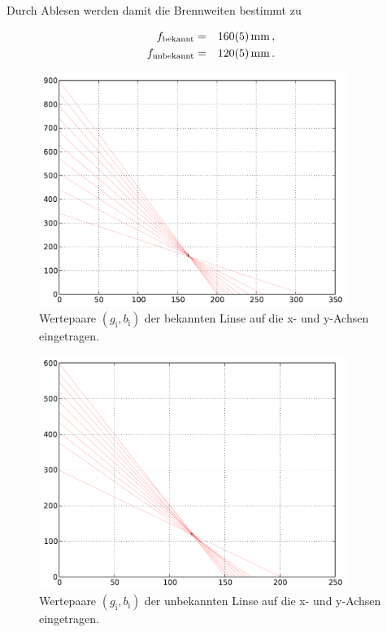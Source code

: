		Durch Ablesen werden damit die Brennweiten bestimmt zu

		\begin{eqnarray*}
			f_\mathrm{bekannt} & = & \SI{160 (5)}{\milli \meter}\,,\\
			f_\mathrm{unbekannt} & = & \SI{120 (5)}{\milli \meter}\,.
		\end{eqnarray*}

		\begin{figure}[h!]
			\centering
			\includegraphics[width = 10cm]{img/graph_bekannt.pdf}
			\caption{Wertepaare $(g_\mathrm{i}, b_\mathrm{i})$ der bekannten Linse auf die x- und y-Achsen eingetragen.}
			\label{fig:graph_bekannt}
		\end{figure}

		\begin{figure}[h!]
			\centering
			\includegraphics[width = 10cm]{img/graph_unbekannt.pdf}
			\caption{Wertepaare $(g_\mathrm{i}, b_\mathrm{i})$ der unbekannten Linse auf die x- und y-Achsen eingetragen.}
			\label{fig:graph_unbekannt}
		\end{figure}

